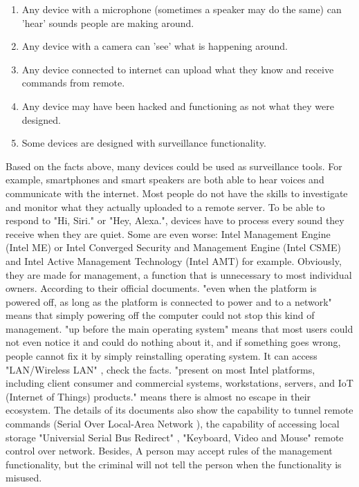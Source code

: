\documentclass[mscthesis]{usiinfthesis}
\begin{document}
\begin{enumerate}
  \item Any device with a microphone (sometimes a speaker may do the same) can 'hear' sounds people are making around.
  \item Any device with a camera can 'see' what is happening around.
  \item Any device connected to internet can upload what they know and receive commands from remote.
  \item Any device may have been hacked and functioning as not what they were designed.
  \item Some devices are designed with surveillance functionality.
\end{enumerate}
Based on the facts above, many devices could be used as surveillance tools. For example, smartphones and smart speakers are both able to hear voices and communicate with the internet. Most people do not have the skills to investigate and monitor what they actually uploaded to a remote server. To be able to respond to "Hi, Siri." or "Hey, Alexa.", devices have to process every sound they receive when they are quiet. Some are even worse: Intel Management Engine (Intel ME) or Intel Converged Security and Management Engine (Intel CSME) and Intel Active Management Technology (Intel AMT) for example. Obviously, they are made for management, a function that is unnecessary to most individual owners. According to their official documents. "even when the platform is powered off, as long as the platform is connected to power and to a network" \citep{ime:csmewp} means that simply powering off the computer could not stop this kind of management. "up before the main operating system" \citep{ime:power} means that most users could not even notice it and could do nothing about it, and if something goes wrong, people cannot fix it by simply reinstalling operating system. It can access "LAN/Wireless LAN" \citep{ime:csmewp}, check the facts. "present on most Intel platforms, including client consumer and commercial systems, workstations, servers, and IoT (Internet of Things) products." \citep{ime:csmewp} means there is almost no escape in their ecosystem. The details of its documents also show the capability to tunnel remote commands (Serial Over Local-Area Network \citep{ime:csmewp}), the capability of accessing local storage "Universial Serial Bus Redirect" \citep{ime:csmewp}, "Keyboard, Video and Mouse" \citep{ime:csmewp} remote control over network. Besides, A person may accept rules of the management functionality, but the criminal will not tell the person when the functionality is misused.
\end{document}
